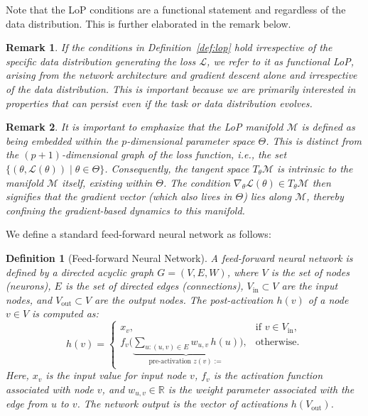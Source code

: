 \documentclass{article}
\newcommand{\Loss}{\mathcal{L}}
\newcommand{\R}{\mathbb{R}}
\newtheorem{definition}{Definition}[section]
\newtheorem{remark}{Remark}[section]
\begin{document}
Note that the LoP conditions are a functional statement and regardless of the data distribution. This is further elaborated in the remark below. 

\begin{remark}
If the conditions in Definition~\ref{def:lop} hold irrespective of the specific data distribution generating the loss $\Loss$, we refer to it as functional LoP, arising from the network architecture and gradient descent  alone and irrespective of the data distribution. This is important because we are primarily interested in properties that can persist even if the task or data distribution evolves.
\end{remark}

\begin{remark}
It is important to emphasize that the LoP manifold $\mathcal{M}$ is defined as being embedded within the $p$-dimensional parameter space $\Theta$. This is distinct from the $(p+1)$-dimensional graph of the loss function, i.e., the set $\{(\theta, \mathcal{L}(\theta)) \mid \theta \in \Theta \}$. Consequently, the tangent space $T_\theta\mathcal{M}$ is intrinsic to the manifold $\mathcal{M}$ itself, existing within $\Theta$. The condition $\nabla_\theta\mathcal{L}(\theta) \in T_\theta\mathcal{M}$ then signifies that the gradient vector (which also lives in $\Theta$) lies along $\mathcal{M}$, thereby confining the gradient-based dynamics to this manifold.
\end{remark}

We define a standard feed-forward neural network as follows:
\begin{definition}[Feed-forward Neural Network]
A feed-forward neural network is defined by a directed acyclic graph $G=(V,E, W)$, where $V$ is the set of nodes (neurons), $E$ is the set of directed edges (connections), $V_{\text{in}} \subset V$ are the input nodes, and $V_{\text{out}} \subset V$ are the output nodes. The post-activation $h(v)$ of a node $v \in V$ is computed as:
\[
h(v)=
\begin{cases}
x_v, & \text{if } v\in V_{\text{in}},\\
f_v \Big(\underbrace{\sum_{u: (u,v)\in E}w_{u,v}\,h(u)}_{\text{pre-activation }z(v):=}\Big), &\text{otherwise}.
\end{cases}
\]
Here, $x_v$ is the input value for input node $v$, $f_v$ is the activation function associated with node $v$, and $w_{u,v} \in \R$ is the weight parameter associated with the edge from $u$ to $v$. The network output is the vector of activations $h(V_{\text{out}})$.
\end{definition}
\end{document}
